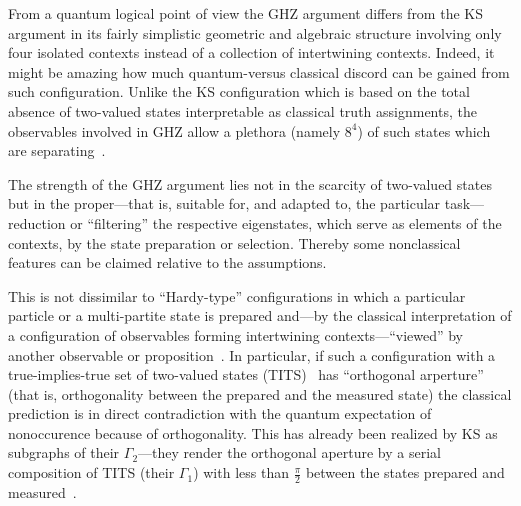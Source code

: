 \documentclass[sn-mathphys]{sn-jnl}%
\theoremstyle{thmstyleone}%
\theoremstyle{thmstyletwo}%
\theoremstyle{thmstylethree}%
\begin{document}
From a quantum logical point of view the GHZ argument differs
from the KS argument in its fairly simplistic geometric and algebraic structure involving only four isolated contexts
instead of a collection of intertwining contexts.
Indeed, it might be amazing how much quantum-versus classical discord can be gained from such configuration.
Unlike the KS configuration which is based on the total absence of two-valued states interpretable as classical truth assignments,
the observables involved in GHZ allow a plethora (namely $8^4$) of such states which are separating~\cite[Theorem~0]{kochen1,specker-ges}.

The strength of the GHZ argument lies not in the scarcity of two-valued states
but in the proper---that is, suitable for, and adapted to, the particular task---reduction or ``filtering'' the respective eigenstates, which serve as elements of the contexts,
by the state preparation or selection.
Thereby some nonclassical features can be claimed relative to the assumptions.

This is not dissimilar to ``Hardy-type'' configurations in which a particular particle or a multi-partite state is prepared and---by the classical interpretation
of a configuration of observables forming intertwining contexts---``viewed'' by another observable or proposition~\cite{svozil-2020-hardy}.
In particular, if such a configuration with a true-implies-true set of two-valued states (TITS)~\cite{2018-minimalYIYS}
has ``orthogonal arperture'' (that is, orthogonality between the prepared and the measured state)
the classical prediction is in direct contradiction with the quantum expectation of nonoccurence because of orthogonality.
This has already been realized by KS as subgraphs of their $\Gamma_2$---they render the orthogonal aperture by a serial composition of TITS (their $\Gamma_1$)
with less than $\frac{\pi}{2}$ between the states prepared and measured~\cite{kochen1,specker-ges}.
\end{document}
